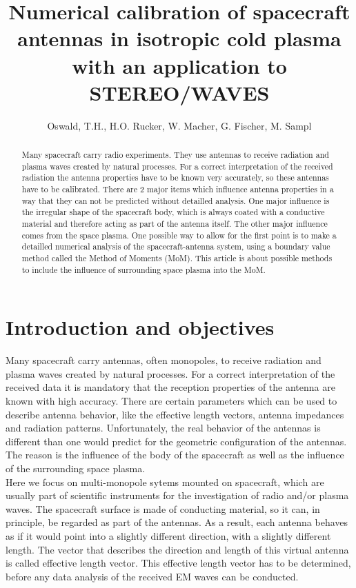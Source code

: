 \documentclass[a4paper,11pt]{article}
\title{Numerical calibration of spacecraft antennas in isotropic cold plasma with an application to STEREO/WAVES}
\author{Oswald, T.H., H.O. Rucker, W. Macher, G. Fischer, M. Sampl}
\begin{document}
\maketitle

\begin{abstract}
Many spacecraft carry radio experiments. They use antennas to receive radiation and plasma waves created by natural processes. For a correct interpretation of the received radiation the antenna properties have to be known very accurately, so these antennas have to be calibrated. There are 2 major items which influence antenna properties in a way that they can not be predicted without detailled analysis. One major influence is the irregular shape of the spacecraft body, which is always coated with a conductive material and therefore acting as part of the antenna itself. The other major influence comes from the space plasma. One possible way to allow for the first point is to make a detailled numerical analysis of the spacecraft-antenna system, using a boundary value method called the Method of Moments (MoM). This article is about possible methods to include the influence of surrounding space plasma into the MoM.
\end{abstract}

\section{Introduction and objectives}
Many spacecraft carry antennas, often monopoles, to receive radiation and plasma waves created by natural processes. For a correct interpretation of the received data it is mandatory that the reception properties of the antenna are known with high accuracy. There are certain parameters which can be used to describe antenna behavior, like the effective length vectors, antenna impedances and radiation patterns. Unfortunately, the real behavior of the antennas is different than one would predict for the geometric configuration of the antennas. The reason is the influence of the body of the spacecraft as well as the influence of the surrounding space plasma.\\

Here we focus on multi-monopole sytems mounted on spacecraft, which are usually part of scientific instruments for the investigation of radio and/or plasma waves. The spacecraft surface is made of conducting material, so it can, in principle, be regarded as part of the antennas. As a result, each antenna behaves as if it would point into a slightly different direction, with a slightly different length. The vector that describes the direction and length of this virtual antenna is called effective length vector. This effective length vector has to be determined, before any data analysis of the received EM waves can be conducted.\\
\end{document}
